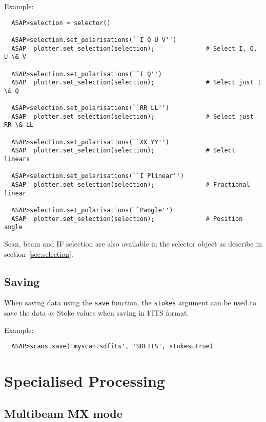 \documentclass[11pt]{article}
\newcommand{\cmd}[1]{{\tt #1}}
\begin{document}
Example:

\begin{verbatim}
  ASAP>selection = selector()

  ASAP>selection.set_polarisations(``I Q U V'')
  ASAP  plotter.set_selection(selection);              # Select I, Q, U \& V

  ASAP>selection.set_polarisations(``I Q'')
  ASAP  plotter.set_selection(selection);              # Select just I \& Q

  ASAP>selection.set_polarisations(``RR LL'')
  ASAP  plotter.set_selection(selection);              # Select just RR \& LL

  ASAP>selection.set_polarisations(``XX YY'')
  ASAP  plotter.set_selection(selection);              # Select linears

  ASAP>selection.set_polarisations(``I Plinear'')
  ASAP  plotter.set_selection(selection);              # Fractional linear

  ASAP>selection.set_polarisations(``Pangle'')
  ASAP  plotter.set_selection(selection);              # Position angle

\end{verbatim}

Scan, beam and IF selection are also available in the selector object as
describe in section~\ref{sec:selection}.

\subsection{Saving}

When saving data using the \cmd{save}
function, the \cmd{stokes} argument can be used to save the data as
Stoke values when saving in FITS format.

Example:

\begin{verbatim}
  ASAP>scans.save('myscan.sdfits', 'SDFITS', stokes=True)
\end{verbatim}

\section{Specialised Processing}

\subsection{Multibeam MX mode}
\end{document}
